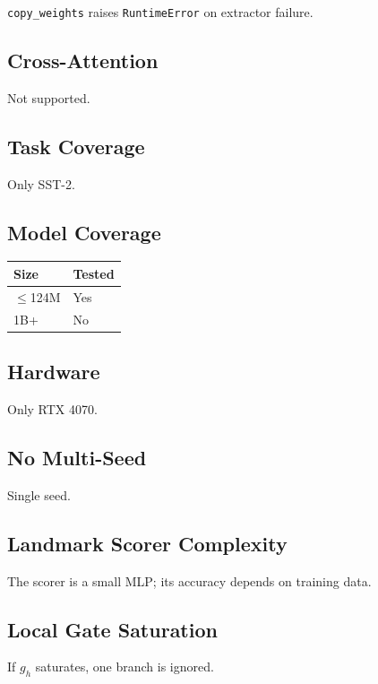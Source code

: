 \texttt{copy\_weights} raises \texttt{RuntimeError} on extractor failure.

\subsection{Cross-Attention}

Not supported.

\subsection{Task Coverage}

Only SST-2.

\subsection{Model Coverage}

\begin{table}[H]
\centering
\small
\begin{tabular}{ll}
\toprule
\textbf{Size} & \textbf{Tested} \\
\midrule
$\le$124M & Yes \\
1B+ & No \\
\bottomrule
\end{tabular}
\end{table}

\subsection{Hardware}

Only RTX 4070.

\subsection{No Multi-Seed}

Single seed.

\subsection{Landmark Scorer Complexity}

The scorer is a small MLP; its accuracy depends on training data.

\subsection{Local Gate Saturation}

If $g_h$ saturates, one branch is ignored.

